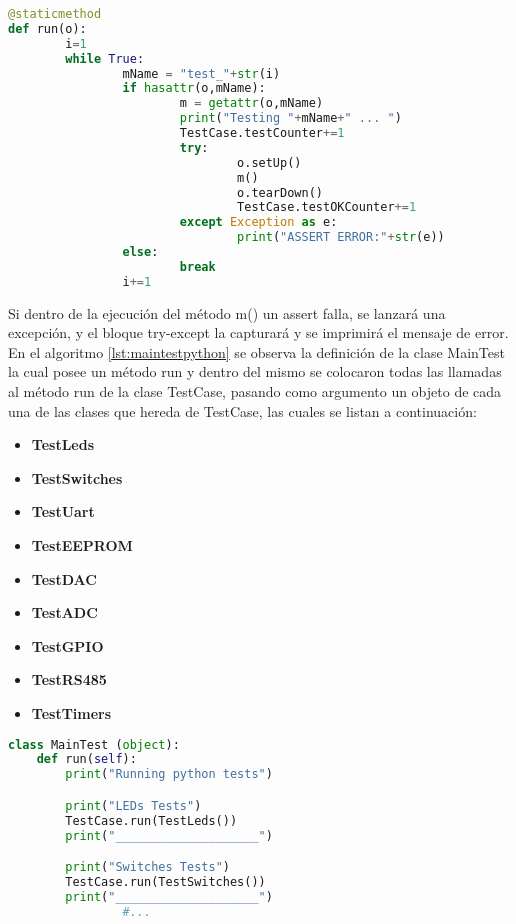 \begin{lstlisting}[label={lst:utestsrun},caption=Método que ejecuta los métodos de test en la biblioteca unittest.py implementada., language={python}]
@staticmethod
def run(o):
		i=1
		while True:
				mName = "test_"+str(i)
				if hasattr(o,mName):
						m = getattr(o,mName)
						print("Testing "+mName+" ... ")
						TestCase.testCounter+=1
						try:
								o.setUp()
								m()
								o.tearDown()
								TestCase.testOKCounter+=1
						except Exception as e:
								print("ASSERT ERROR:"+str(e))
				else:
						break
				i+=1
\end{lstlisting}

Si dentro de la ejecución del método m() un assert falla, se lanzará una excepción, y el bloque try-except la capturará y se imprimirá el mensaje de error. En el algoritmo \ref{lst:maintestpython} se observa la definición de la clase MainTest la cual posee un método run y dentro del mismo se colocaron todas las llamadas al método run de la clase TestCase, pasando como argumento un objeto de cada una de las clases que hereda de TestCase, las cuales se listan a continuación:

\begin{itemize}
	\item \textbf{TestLeds}
	\item \textbf{TestSwitches}
	\item \textbf{TestUart}
	\item \textbf{TestEEPROM}
	\item \textbf{TestDAC}
	\item \textbf{TestADC}
	\item \textbf{TestGPIO}
	\item \textbf{TestRS485}	
	\item \textbf{TestTimers}
\end{itemize}

\begin{lstlisting}[label={lst:maintestpython},caption=Clase MainTest desde donde se ejecutan todos los tests Python., language={python}]
class MainTest (object):
    def run(self):
        print("Running python tests")

        print("LEDs Tests")
        TestCase.run(TestLeds())
        print("____________________")

        print("Switches Tests")
        TestCase.run(TestSwitches())
        print("____________________")
				#...
\end{lstlisting}
 

